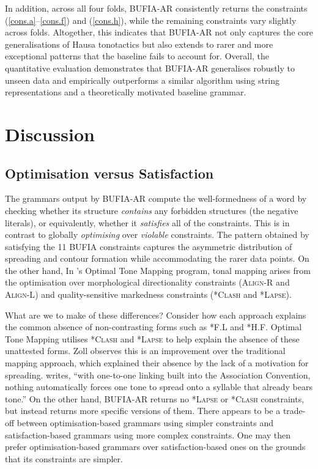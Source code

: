 \documentclass{CUP-JNL-PHO}%
\theoremstyle{definition}
\numberwithin{equation}{section}
\theoremstyle{definition}
\begin{document}
In addition, across all four folds, BUFIA-AR consistently 
returns the constraints (\ref{cons.a}–\ref{cons.f}) and (\ref{cons.h}), 
while the remaining constraints vary slightly across folds.
Altogether, this indicates that BUFIA-AR not only captures the core
generalisations of Hausa tonotactics but also extends to rarer and
more exceptional patterns that the baseline fails to account
for. Overall, the quantitative evaluation demonstrates that BUFIA-AR
generalises robustly to unseen data and empirically outperforms
a similar algorithm using string representations
and a theoretically motivated baseline grammar.


\section{Discussion}
\label{sec:discussion}

\subsection{Optimisation versus Satisfaction}
\label{sec:discussion.ot}
The grammars output by BUFIA-AR compute the well-formedness of a word
by checking whether its structure \textit{contains} any forbidden
structures (the negative literals), or equivalently, whether it
\textit{satisfies} all of the constraints. This is in contrast to
globally \textit{optimising} over \textit{violable} constraints.  The
pattern obtained by satisfying the 11 BUFIA constraints captures the
asymmetric distribution of spreading and contour formation while
accommodating the rarer data points. On the other hand, In
\citet{zoll2003optimal}’s Optimal Tone Mapping program, tonal mapping
arises from the optimisation over morphological directionality
constraints (\textsc{Align-R} and \textsc{Align-L}) and
quality-sensitive markedness constraints (\textsc{*Clash} and
\textsc{*Lapse}).

What are we to make of these differences? Consider how each approach explains the
common absence of non-contrasting forms such as
\textsc{*F.L} and \textsc{*H.F}.   Optimal Tone Mapping utilises
\textsc{*Clash} and \textsc{*Lapse} to help explain the absence of these unattested 
forms. Zoll observes this is an improvement over the traditional mapping approach, 
which explained their absence by the lack of a motivation for spreading. 
\citet{zoll2003optimal} writes, ``with one-to-one linking built into the Association 
Convention, nothing automatically forces one tone to
spread onto a syllable that already bears tone.''
On the other hand, BUFIA-AR returns no \textsc{*Lapse} or \textsc{*Clash} 
constraints, but instead returns more specific versions of them. 
There appears to be a trade-off between optimisation-based grammars using simpler 
constraints and satisfaction-based grammars using more complex constraints. 
One may then prefer optimisation-based grammars over satisfaction-based ones on the 
grounds that its constraints are simpler.
\end{document}
